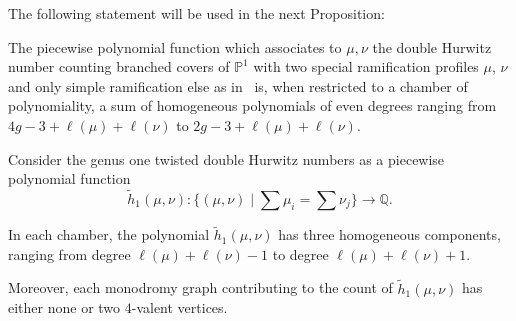 \documentclass[ALCO,published]{cedram}
\begin{document}
 
The following statement will be used in the next Proposition:
\begin{coro}\label{cor-joh}
  The piecewise polynomial function which associates to $\mu,\nu$ the double Hurwitz number counting branched covers of $\mathbb{P}^1$ with two special ramification profiles $\mu$, $\nu$ and only simple ramification else as in~\cite{GJV05, CJM11} is, when restricted to a chamber of polynomiality, a sum of homogeneous polynomials of even degrees ranging from $ 4g-3+\ell(\mu)+\ell(\nu)$ to $2g-3+\ell(\mu)+\ell(\nu)$.
\end{coro}
 
  \begin{prop}\label{prop-ppingenus1}
 Consider the genus one twisted double Hurwitz numbers as a piecewise polynomial function 
$$\tilde{h}_1(\mu,\nu):\Big\{(\mu,\nu) \mid \sum \mu_i=\sum\nu_j\Big\} \longrightarrow\mathbb{Q}.$$ 

In each chamber, the polynomial $\tilde{h}_1(\mu,\nu)$ has three homogeneous components, ranging from degree $\ell(\mu)+\ell(\nu)-1$ to degree $\ell(\mu)+\ell(\nu)+1$.

Moreover, each monodromy graph contributing to the count of  $\tilde{h}_1(\mu,\nu)$ has either none or two $4$-valent vertices.
 \end{prop}
 
\end{document}
